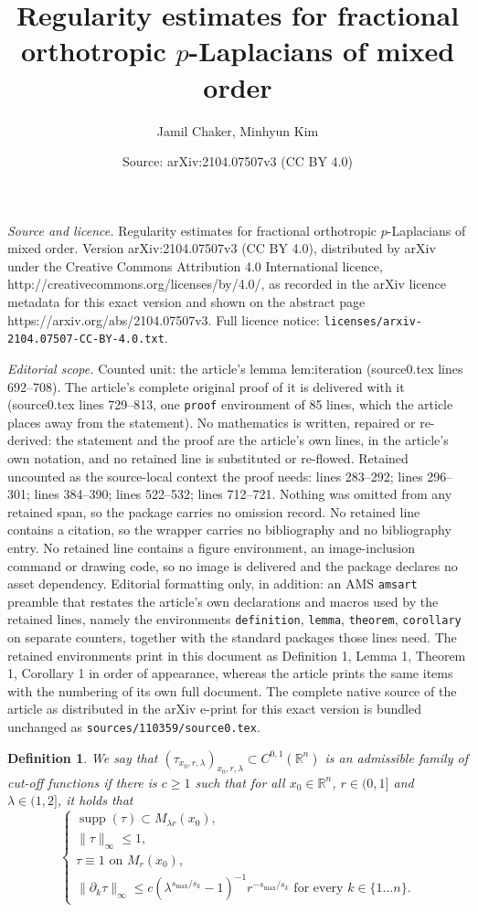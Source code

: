 \documentclass[10pt,a4paper]{amsart}
\title{Regularity estimates for fractional orthotropic $p$-Laplacians of mixed order}
\author{Jamil Chaker, Minhyun Kim}
\date{Source: arXiv:2104.07507v3 (CC BY 4.0)}
\newtheorem{definition}{Definition}
\newcommand{\R}{\mathbb{R}}
\DeclareMathOperator{\supp}{supp}
\begin{document}
\maketitle

\noindent\emph{Source and licence.} Regularity estimates for fractional orthotropic $p$-Laplacians of mixed order. Version arXiv:2104.07507v3 (CC BY 4.0), distributed by arXiv under the Creative Commons Attribution 4.0 International licence, http://creativecommons.org/licenses/by/4.0/, as recorded in the arXiv licence metadata for this exact version and shown on the abstract page https://arxiv.org/abs/2104.07507v3. Full licence notice: \texttt{licenses/arxiv-2104.07507-CC-BY-4.0.txt}.\par\smallskip

\noindent\textit{Editorial scope.} Counted unit: the article's lemma lem:iteration (source0.tex lines 692--708). The article's complete original proof of it is delivered with it (source0.tex lines 729--813, one \texttt{proof} environment of 85 lines, which the article places away from the statement). No mathematics is written, repaired or re-derived: the statement and the proof are the article's own lines, in the article's own notation, and no retained line is substituted or re-flowed.  Retained uncounted as the source-local context the proof needs: lines 283--292; lines 296--301; lines 384--390; lines 522--532; lines 712--721.  Nothing was omitted from any retained span, so the package carries no omission record.  No retained line contains a citation, so the wrapper carries no bibliography and no bibliography entry.  No retained line contains a figure environment, an image-inclusion command or drawing code, so no image is delivered and the package declares no asset dependency.  Editorial formatting only, in addition: an AMS \texttt{amsart} preamble that restates the article's own declarations and macros used by the retained lines, namely the environments \texttt{definition}, \texttt{lemma}, \texttt{theorem}, \texttt{corollary} on separate counters, together with the standard packages those lines need.  The retained environments print in this document as Definition 1, Lemma 1, Theorem 1, Corollary 1 in order of appearance, whereas the article prints the same items with the numbering of its own full document.  The complete native source of the article as distributed in the arXiv e-print for this exact version is bundled unchanged as \texttt{sources/110359/source0.tex}.
\begin{definition} \label{def:cut-off}
We say that $(\tau_{x_0,r,\lambda})_{x_0,r,\lambda} \subset C^{0,1}(\R^n)$ is an admissible family of cut-off functions if there is 
$c \ge 1$ such that for all $x_0 \in \R^n$, $r \in (0,1]$ and $\lambda \in (1,2]$, it holds that
\[ \begin{cases}
\supp(\tau) \subset M_{\lambda r}(x_0), \\
\| \tau \|_{\infty} \le 1, \\
\tau \equiv 1 \text{ on } M_r(x_0), \\
\| \partial_k \tau \|_{\infty} \le c \left( \lambda^{s_{\max}/s_k} -1 \right)^{-1}r^{-s_{\max}/s_k} \text{ for every } k \in \lbrace 1 \dots n \rbrace.
\end{cases} \]
\end{definition}
\end{document}

